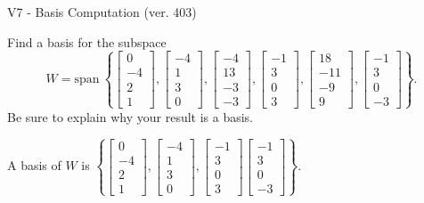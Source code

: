 \begin{exercise}
  \begin{exerciseTitle}V7 - Basis Computation (ver. 403)\end{exerciseTitle}
  \begin{exerciseStatement}
    Find a basis for the subspace 
\[W=\mathrm{span}\ \left\{\left[\begin{array}{r}
0 \\
-4 \\
2 \\
1
\end{array}\right] , \left[\begin{array}{r}
-4 \\
1 \\
3 \\
0
\end{array}\right] , \left[\begin{array}{r}
-4 \\
13 \\
-3 \\
-3
\end{array}\right] , \left[\begin{array}{r}
-1 \\
3 \\
0 \\
3
\end{array}\right] , \left[\begin{array}{r}
18 \\
-11 \\
-9 \\
9
\end{array}\right] , \left[\begin{array}{r}
-1 \\
3 \\
0 \\
-3
\end{array}\right]\right\}.\]
 Be sure to explain why your result is a basis.


  \end{exerciseStatement}
  \begin{exerciseAnswer}
   A basis of \(W\) is  \(\left\{\left[\begin{array}{r}
0 \\
-4 \\
2 \\
1
\end{array}\right] , \left[\begin{array}{r}
-4 \\
1 \\
3 \\
0
\end{array}\right] , \left[\begin{array}{r}
-1 \\
3 \\
0 \\
3
\end{array}\right] \left[\begin{array}{r}
-1 \\
3 \\
0 \\
-3
\end{array}\right]\right\}\).
  


  \end{exerciseAnswer}
\end{exercise}